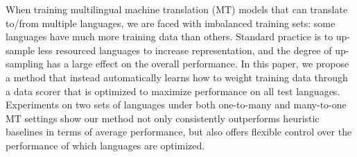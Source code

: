 When training multilingual machine translation (MT) models that can translate to/from multiple languages, we are faced with imbalanced training sets: some languages have much more training data than others. Standard practice is to up-sample less resourced languages to increase representation, and the degree of up-sampling has a large effect on the overall performance. In this paper, we propose a method that instead automatically learns how to weight training data through a data scorer that is optimized to maximize performance on all test languages. Experiments on two sets of languages under both one-to-many and many-to-one MT settings show our method not only consistently outperforms heuristic baselines in terms of average performance, but also offers flexible control over the performance of which languages are optimized.
